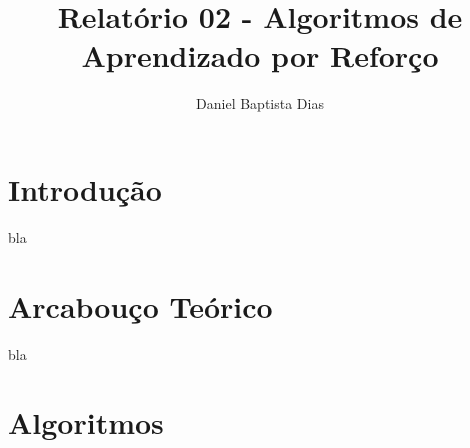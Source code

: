 \documentclass[letterpaper]{article}
\title{Relatório 02 - Algoritmos de Aprendizado por Reforço}
\author{Daniel Baptista Dias}
\begin{document}
\maketitle

\section{Introdução}
\label{sec:introducao}

bla




\section{Arcabouço Teórico}

bla





\section{Algoritmos}
\end{document}
